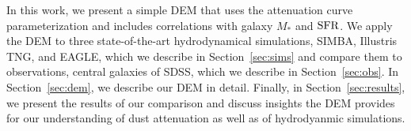 In this work, we present a simple DEM that uses the \cite{noll2009}
attenuation curve parameterization and includes correlations with galaxy $M_*$
and ${\rm SFR}$. We apply the DEM to three state-of-the-art hydrodynamical
simulations, SIMBA, Illustris TNG, and EAGLE, which we describe in
Section~\ref{sec:sims} and compare them to observations, central 
galaxies of SDSS, which we describe in Section~\ref{sec:obs}. In
Section~\ref{sec:dem}, we describe our DEM in detail. Finally, in
Section~\ref{sec:results}, we present the results of our comparison and discuss
insights the DEM provides for our understanding of dust attenuation as well as  
of hydrodyanmic simulations. 

